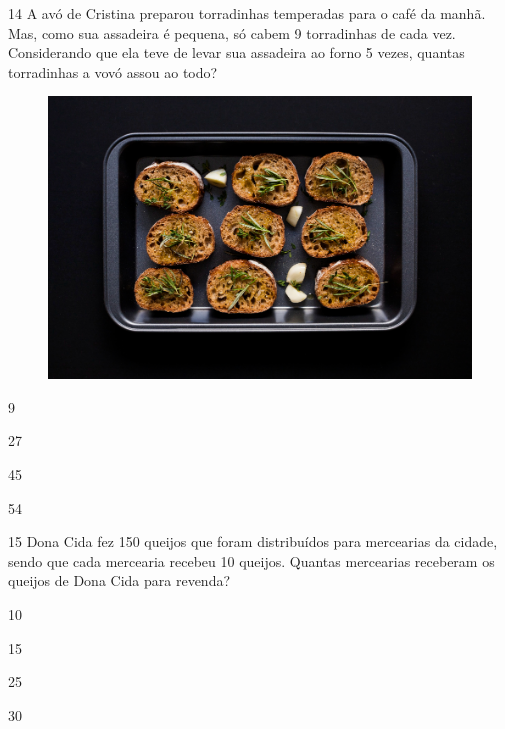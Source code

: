 \num{14} A avó de Cristina preparou torradinhas temperadas para o café da manhã.
Mas, como sua assadeira é pequena, só cabem 9 torradinhas de cada vez.
Considerando que ela teve de levar sua assadeira ao forno 5 vezes,
quantas torradinhas a vovó assou ao todo?

\begin{figure}[H]
\centering
\includegraphics[width=.5\textwidth]{./media/image159.png}
\end{figure}

\begin{escolha}[itemsep=-5pt]
\item 9

\item 27

\item 45

\item 54
\end{escolha}

\num{15} Dona Cida fez 150 queijos que foram distribuídos para mercearias da cidade, sendo que cada mercearia recebeu 10 queijos. Quantas mercearias receberam os queijos de Dona
Cida para revenda?

\begin{escolha}[itemsep=-5pt]
\item 10

\item 15

\item 25

\item 30
\end{escolha}
